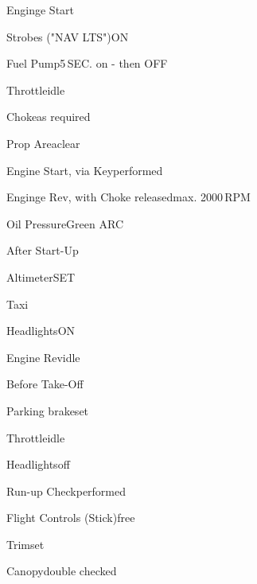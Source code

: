 \begin{checklist}{Enginge Start}
	\item{Strobes ("NAV LTS")}{ON}
	\item{Fuel Pump}{5\,SEC. on - then OFF}
	\item{Throttle}{idle}
	\item{Choke}{as required}
	\item{Prop Area}{clear}
	\item{Engine Start, via Key}{performed}
	\item{Enginge Rev, with Choke released}{max. 2000\,RPM}
	\item{Oil Pressure}{Green ARC}
\end{checklist}

\begin{checklist}{After Start-Up}
	\item{Altimeter}{SET}

\end{checklist}

\begin{checklist}{Taxi}
	\item{Headlights}{ON}
	\item{Engine Rev}{idle}
\end{checklist}

\begin{checklist}{Before Take-Off}
	\item{Parking brake}{set}
	\item{Throttle}{idle}
	\item{Headlights}{off}
	\item{Run-up Check}{performed}
	\item{Flight Controls (Stick)}{free}
	\item{Trim}{set}
	\item{Canopy}{double checked}
\end{checklist}

